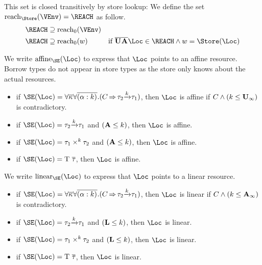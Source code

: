 This set is closed transitively by store lookup: We define the set
$\Reach\Store\VEnv = \REACH$ as follow.
\begin{align*}
  \REACH &\supseteq \RS\Store\VEnv \\
  \REACH &\supseteq \RS\Store w & \text{if }
                                     \Multi\IBORROW\Multi\MBORROW\Loc
                                     \in \REACH \wedge w = \Store (\Loc)
\end{align*}

We write $\Affine\SE\Loc$ to express that $\Loc$ points to an affine
resource. Borrow types do not appear in store types as the store only
knows about the actual resources.
\begin{itemize}
\item if $\SE (\Loc) =
  \forall\Multi\kvar\forall\Multi{\bvar{\alpha}{k}}.(\qual{C}{\tau_2\tarr{k}\tau_1})$,
  then $\Loc$ is affine if $C \wedge (k \leq \mathbf{U}_\infty)$ is contradictory.
\item if $\SE (\Loc) = \tau_2\tarr{k}{\tau_1}$ and $(\mathbf{A} \leq k)$, then $\Loc$ is affine.
\item if $\SE (\Loc) = \tyPair[k]{\tau_1}{\tau_2}$ and $(\mathbf{A} \leq k)$, then $\Loc$ is affine.
\item if $\SE (\Loc) = \tapp{\tcon}{\Multi\tau}$, then $\Loc$ is affine.
\end{itemize}

We write $\Linear\SE\Loc$ to express that $\Loc$ points to a linear
resource.
\begin{itemize}
\item if $\SE (\Loc) =
  \forall\Multi\kvar\forall\Multi{\bvar{\alpha}{k}}.(\qual{C}{\tau_2\tarr{k}\tau_1})$,
  then $\Loc$ is linear if $C \wedge (k \leq \mathbf{A}_\infty)$ is contradictory.
\item if $\SE (\Loc) = \tau_2\tarr{k}{\tau_1}$ and $(\mathbf{L} \leq k)$, then $\Loc$ is linear.
\item if $\SE (\Loc) = \tyPair[k]{\tau_1}{\tau_2}$ and $(\mathbf{L} \leq k)$, then $\Loc$ is linear.
\item if $\SE (\Loc) = \tapp{\tcon}{\Multi\tau}$, then $\Loc$ is linear.
\end{itemize}

